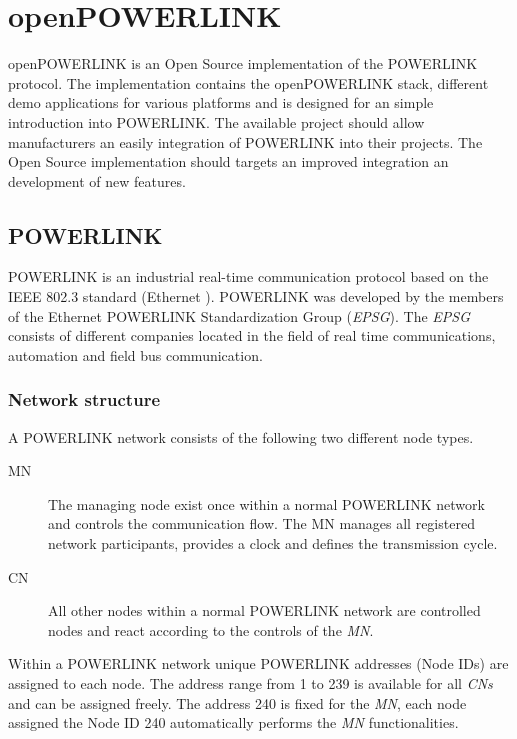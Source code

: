 \chapter{openPOWERLINK}
\label{cha:oplk}
openPOWERLINK is an Open Source implementation of the POWERLINK protocol.
The implementation contains the openPOWERLINK stack, different demo applications for various platforms and is designed for an simple introduction into POWERLINK.
The available project should allow manufacturers an easily integration of POWERLINK into their projects.
The Open Source implementation should targets an improved integration an development of new features.


\section{POWERLINK}
\label{sec:powerlink}
POWERLINK is an industrial real-time communication protocol based on the IEEE 802.3 standard (Ethernet \cite{ethernet_ieee_2016}).
POWERLINK was developed by the members of the Ethernet POWERLINK Standardization Group (\emph{EPSG}).
The \emph{EPSG} consists of different companies located in the field of real time communications, automation and field bus communication. \cite{epsg_hp}


\subsection{Network structure}
\label{sec:oplk_powerlink_network}
A POWERLINK network consists of the following two different node types.

\begin{description}
    \item[MN] The managing node exist once within a normal POWERLINK network and controls the communication flow.
    The MN manages all registered network participants, provides a clock and defines the transmission cycle.
    \item[CN] All other nodes within a normal POWERLINK network are controlled nodes and react according to the controls of the \emph{MN}.
\end{description}

Within a POWERLINK network unique POWERLINK addresses (Node IDs) are assigned to each node.
The address range from 1 to 239 is available for all \emph{CNs} and can be assigned freely.
The address 240 is fixed for the \emph{MN}, each node assigned the Node ID 240 automatically performs the \emph{MN} functionalities.
\cite{epsg_epsg_2013}

